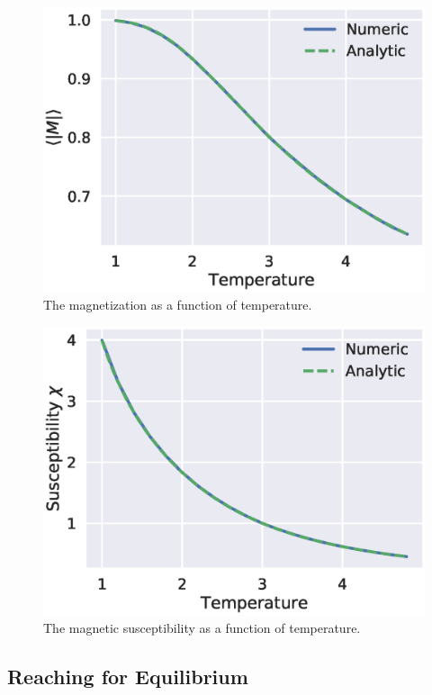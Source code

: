 \documentclass[aps,reprint]{revtex4-1}
\begin{document}
\begin{figure}[H]
  \centering
  \includegraphics[width=\columnwidth]{figures/4bMagnetization.eps}
  \caption{The magnetization as a function of temperature.}
  \label{fig:4bmag}
\end{figure}
\begin{figure}[H]
  \centering
  \includegraphics[width=\columnwidth]{figures/4bSusceptibility.eps}
  \caption{The magnetic susceptibility as a function of temperature.}
  \label{fig:4bsusceptibility}
\end{figure}

\subsection{Reaching for Equilibrium}
\label{sec:reaching-equilibrium}
\end{document}
